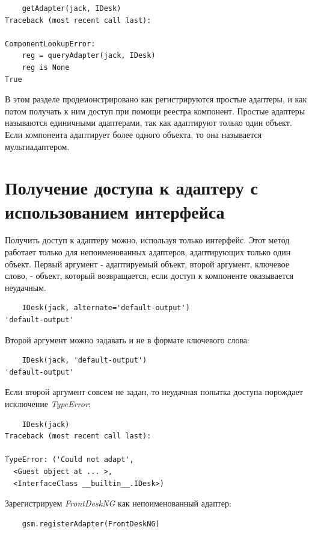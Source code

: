 \documentclass[a4paper,openany,twoside,draft]{book}
\providecommand*{\DUroletitlereference}[1]{\textsl{#1}}
\begin{document}
\begin{verbatim}
    getAdapter(jack, IDesk)
Traceback (most recent call last):

ComponentLookupError:
    reg = queryAdapter(jack, IDesk)
    reg is None
True
\end{verbatim}

В этом разделе продемонстрировано как регистрируются простые адаптеры, и как потом получать к ним доступ при помощи реестра компонент.  Простые адаптеры называются единичными адаптерами, так как адаптируют только один объект.  Если компонента адаптирует более одного объекта, то она называется мультиадаптером.


\section{Получение доступа к адаптеру с использованием интерфейса%
  \label{id37}%
}

Получить доступ к адаптеру можно, используя только интерфейс.  Этот метод работает только для непоименованных адаптеров, адаптирующих только один объект.  Первый аргумент - адаптируемый объект, второй аргумент, ключевое слово, - объект, который возвращается, если доступ к компоненте оказывается неудачным.

\begin{verbatim}
    IDesk(jack, alternate='default-output')
'default-output'
\end{verbatim}

Второй аргумент можно задавать и не в формате ключевого слова:

\begin{verbatim}
    IDesk(jack, 'default-output')
'default-output'
\end{verbatim}

Если второй аргумент совсем не задан, то неудачная попытка доступа
порождает исключение \DUroletitlereference{TypeError}:

\begin{verbatim}
    IDesk(jack)
Traceback (most recent call last):

TypeError: ('Could not adapt',
  <Guest object at ... >,
  <InterfaceClass __builtin__.IDesk>)
\end{verbatim}

Зарегистрируем \DUroletitlereference{FrontDeskNG} как непоименованный адаптер:

\begin{verbatim}
    gsm.registerAdapter(FrontDeskNG)
\end{verbatim}
\end{document}
